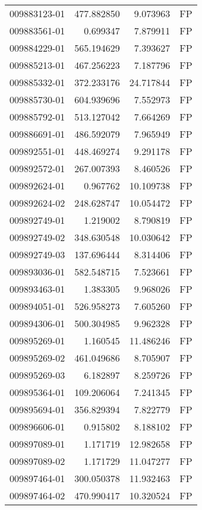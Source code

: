 \begin{tabular}{lrrl}
009883123-01 &  477.882850 &     9.073963 &   FP \\
009883561-01 &    0.699347 &     7.879911 &   FP \\
009884229-01 &  565.194629 &     7.393627 &   FP \\
009885213-01 &  467.256223 &     7.187796 &   FP \\
009885332-01 &  372.233176 &    24.717844 &   FP \\
009885730-01 &  604.939696 &     7.552973 &   FP \\
009885792-01 &  513.127042 &     7.664269 &   FP \\
009886691-01 &  486.592079 &     7.965949 &   FP \\
009892551-01 &  448.469274 &     9.291178 &   FP \\
009892572-01 &  267.007393 &     8.460526 &   FP \\
009892624-01 &    0.967762 &    10.109738 &   FP \\
009892624-02 &  248.628747 &    10.054472 &   FP \\
009892749-01 &    1.219002 &     8.790819 &   FP \\
009892749-02 &  348.630548 &    10.030642 &   FP \\
009892749-03 &  137.696444 &     8.314406 &   FP \\
009893036-01 &  582.548715 &     7.523661 &   FP \\
009893463-01 &    1.383305 &     9.968026 &   FP \\
009894051-01 &  526.958273 &     7.605260 &   FP \\
009894306-01 &  500.304985 &     9.962328 &   FP \\
009895269-01 &    1.160545 &    11.486246 &   FP \\
009895269-02 &  461.049686 &     8.705907 &   FP \\
009895269-03 &    6.182897 &     8.259726 &   FP \\
009895364-01 &  109.206064 &     7.241345 &   FP \\
009895694-01 &  356.829394 &     7.822779 &   FP \\
009896606-01 &    0.915802 &     8.188102 &   FP \\
009897089-01 &    1.171719 &    12.982658 &   FP \\
009897089-02 &    1.171729 &    11.047277 &   FP \\
009897464-01 &  300.050378 &    11.932463 &   FP \\
009897464-02 &  470.990417 &    10.320524 &   FP \\

\end{tabular}
